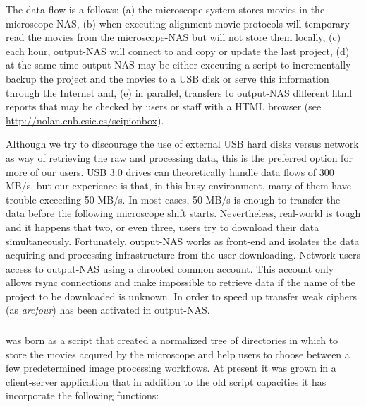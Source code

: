 The data flow is a follows: (a) the microscope system stores movies in the microscope-NAS, (b) when executing alignment-movie protocols \scipionbox will temporary read the movies from 
the microscope-NAS but will not store them locally, (c) each hour, output-NAS will connect to \scipionbox and copy or update the last \scipion project, (d) at the same time output-NAS may be either executing a script to incrementally backup the \scipion project and the movies to a USB disk or serve this information through the Internet and, (e) in parallel, \scipionbox transfers to  output-NAS different html reports that may be checked by users or staff with a HTML browser (see \url{http://nolan.cnb.csic.es/scipionbox}).

Although we try to discourage the use of external USB hard disks versus network as way of retrieving the raw and processing data, this is the preferred option for more of our users.
USB 3.0 drives can theoretically handle data flows of 300 MB/s, but our experience is that, in this busy environment, many of them  have trouble exceeding 50 MB/s. In most cases, 50 MB/s is enough to transfer the data before the following microscope shift starts. Nevertheless, real-world is tough and it happens that two, or even three,  users try to download their data simultaneously. Fortunately, output-NAS works as front-end and isolates the data acquiring and processing infrastructure from the user downloading. Network users access to output-NAS using a chrooted common account. This account only allows rsync connections and make impossible to retrieve data if the name of the project to be downloaded is unknown. In order to speed up transfer weak ciphers (as \emph{arcfour}) has been activated in output-NAS.     

\subsubsection{\emadmin}

\emadmin was born as a script that created a normalized tree of directories  in which to store the movies acqured by the microscope and help users to choose between a few predetermined image processing workflows. At present it was grown in a client-server application that in addition to the old script capacities it has incorporate the following functions:

